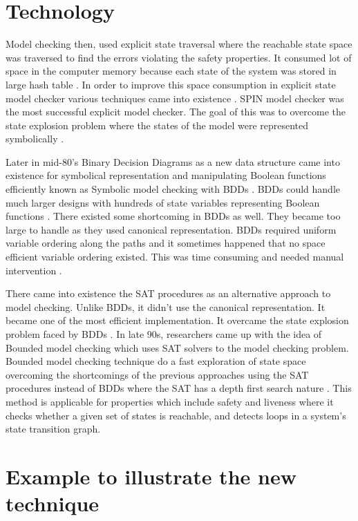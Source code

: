 \documentclass[a4paper,10pt]{report}
\begin{document}
\section{Technology}
\label{tech}

Model checking then, used explicit state traversal where the reachable state space was traversed to find the errors violating the safety properties. It consumed lot of space in the computer memory because each state of the system was stored in large hash table \cite{Mironov2006}. In order to improve this space consumption in explicit state model checker various techniques came into existence \cite{McMillan1992}. SPIN model checker was the most successful explicit model checker. The goal of this was to overcome the state explosion problem where the states of the model were represented symbolically \cite{McMillan1992}.

Later in mid-80's Binary Decision Diagrams as a new data structure came into existence for symbolical representation and manipulating Boolean functions efficiently known as Symbolic model checking with BDDs \cite{Berard}. BDDs could handle much larger designs with hundreds of state variables representing Boolean functions \cite{ErichGamma1995}. There existed some shortcoming in BDDs as well. They became too large to handle as they used canonical representation. BDDs required uniform variable ordering along the paths and it sometimes happened that no space efficient variable ordering existed. This was time consuming and needed manual intervention \cite{McMillan1992}.

There came into existence the SAT procedures as an alternative approach to model checking. Unlike BDDs, it didn’t use the canonical representation. It became one of the most efficient implementation. It overcame the state explosion problem faced by BDDs \cite{McMillan1992}. 
In late 90s, researchers came up with the idea of Bounded model checking which uses SAT solvers to the model checking problem. Bounded model checking technique do a fast exploration of state space overcoming the shortcomings of the previous approaches using the SAT procedures instead of BDDs where the SAT has a depth first search nature \cite{McMillan1992}. This method is applicable for properties which include safety and liveness where it checks whether a given set of states is reachable, and detects loops in a system’s state transition graph.

\section{Example to illustrate the new technique}\cite{D.Jackson}
\label{Example}
\end{document}
